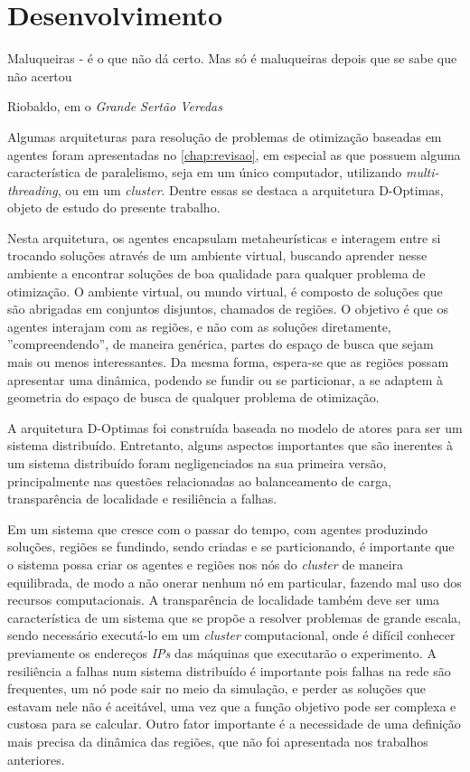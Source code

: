 

\chapter{Desenvolvimento}
\label{chap:desenvolvimento}

\epigraph{Maluqueiras - é o que não dá certo. Mas só é maluqueiras depois que se sabe que não acertou}{Riobaldo, em o \textit{Grande Sertão Veredas}}

Algumas arquiteturas para resolução de problemas de otimização baseadas em agentes foram apresentadas no \autoref{chap:revisao}, em especial as que possuem alguma característica de paralelismo, seja em um único computador, utilizando \textit{multi-threading}, ou em um \textit{cluster}. Dentre essas se destaca a arquitetura D-Optimas, objeto de estudo do presente trabalho. 

Nesta arquitetura, os agentes encapsulam metaheurísticas e interagem entre si trocando soluções através de um ambiente virtual, buscando aprender nesse ambiente a encontrar soluções de boa qualidade para qualquer problema de otimização. O ambiente virtual, ou mundo virtual, é composto de soluções que são abrigadas em conjuntos disjuntos, chamados de regiões. O objetivo é que os agentes interajam com as regiões, e não com as soluções diretamente, ''compreendendo'', de maneira genérica, partes do espaço de busca que sejam mais ou menos interessantes. Da mesma forma, espera-se que as regiões possam apresentar uma dinâmica, podendo se fundir ou se particionar, a se adaptem à geometria do espaço de busca de qualquer problema de otimização.   

A arquitetura D-Optimas foi construída baseada no modelo de atores para ser um sistema distribuído. Entretanto, alguns aspectos importantes que são inerentes à um sistema distribuído foram negligenciados na sua primeira versão, principalmente nas questões relacionadas ao balanceamento de carga, transparência de localidade e resiliência a falhas.

Em um sistema que cresce com o passar do tempo, com agentes produzindo soluções, regiões se fundindo, sendo criadas e se particionando, é importante que o sistema possa criar os agentes e regiões nos nós do \textit{cluster} de maneira equilibrada, de modo a não onerar nenhum nó em particular, fazendo mal uso dos recursos computacionais. A transparência de localidade também deve ser uma característica de um sistema que se propõe a resolver problemas de grande escala, sendo necessário executá-lo em um \textit{cluster} computacional, onde é difícil conhecer previamente os endereços \textit{IPs} das máquinas que executarão o experimento. A resiliência a falhas num sistema distribuído é importante pois falhas na rede são frequentes, um nó pode sair no meio da simulação, e perder as soluções que estavam nele não é aceitável, uma vez que a função objetivo pode ser complexa e custosa para se calcular.
Outro fator importante é a necessidade de uma definição mais precisa da dinâmica das regiões,  que não foi apresentada nos trabalhos anteriores.

